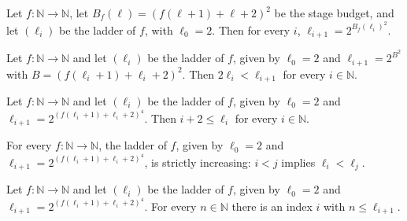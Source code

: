 \begin{theorem}
\label{Turing.NTimeDiag.ladder_succ}
\leanok
{}
Let $f : \mathbb{N} \to \mathbb{N}$, let $B_f(\ell) = (f(\ell+1) + \ell + 2)^2$ be the stage
budget, and let $(\ell_i)$ be the ladder of $f$, with $\ell_0 = 2$. Then for every $i$,
$\ell_{i+1} = 2^{B_f(\ell_i)^2}$.
\end{theorem}

\begin{theorem}
\label{Turing.NTimeDiag.two_mul_lt_ladder_succ}
\leanok
{}
Let $f : \mathbb{N} \to \mathbb{N}$ and let $(\ell_i)$ be the ladder of $f$, given by
$\ell_0 = 2$ and $\ell_{i+1} = 2^{B^2}$ with $B = (f(\ell_i+1) + \ell_i + 2)^2$. Then
$2\ell_i < \ell_{i+1}$ for every $i \in \mathbb{N}$.
\end{theorem}

\begin{theorem}
\label{Turing.NTimeDiag.le_ladder}
\leanok
{}
Let $f : \mathbb{N} \to \mathbb{N}$ and let $(\ell_i)$ be the ladder of $f$, given by
$\ell_0 = 2$ and $\ell_{i+1} = 2^{(f(\ell_i+1) + \ell_i + 2)^4}$. Then $i + 2 \le \ell_i$ for
every $i \in \mathbb{N}$.
\end{theorem}

\begin{theorem}
\label{Turing.NTimeDiag.ladder_strictMono}
\leanok
{}
For every $f : \mathbb{N} \to \mathbb{N}$, the ladder of $f$, given by $\ell_0 = 2$ and
$\ell_{i+1} = 2^{(f(\ell_i+1) + \ell_i + 2)^4}$, is strictly increasing: $i < j$ implies
$\ell_i < \ell_j$.
\end{theorem}

\begin{theorem}
\label{Turing.NTimeDiag.exists_le_ladder_succ}
\leanok
{}
Let $f : \mathbb{N} \to \mathbb{N}$ and let $(\ell_i)$ be the ladder of $f$, given by
$\ell_0 = 2$ and $\ell_{i+1} = 2^{(f(\ell_i+1) + \ell_i + 2)^4}$. For every $n \in \mathbb{N}$
there is an index $i$ with $n \le \ell_{i+1}$.
\end{theorem}

